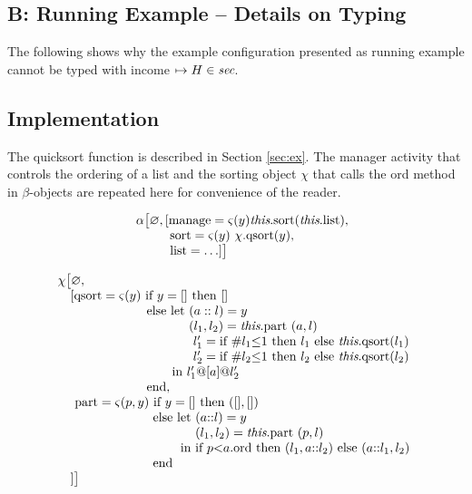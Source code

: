 \documentclass[10pt, conference, compsocconf]{IEEEtran}
\newcommand{\symb}[1]{\makebox{\it #1}}
\begin{document}
{\subsection*{B: Running Example -- Details on Typing}
The following shows why the example configuration presented as running example cannot be typed
with income $\mapsto H \in \symb{sec}$. 

\subsection*{Implementation}
The quicksort function  is described in Section \ref{sec:ex}.
The manager activity that controls the ordering of a list and the sorting object $\chi$ that
calls the ord method in $\beta$-objects are repeated here for convenience of the reader.

\noindent \begin{small}
\[
 \begin{array}{ll}
   & \alpha \big[\varnothing, [ \text{manage} = \varsigma(y) \text{{\it this}.sort({\it this}.list)}, \\
  & \  \qquad\ \text{sort} = \varsigma(y)\ \chi.\text{qsort}(y),\\
  & \  \qquad\ \text{list} = \ldots ] \big]
 \end{array}
\]
\end{small}

\noindent \begin{small}
\[
 \begin{array}{l}
   \chi \big[\varnothing, \\
   \quad [ \text{qsort} = \varsigma(y)\ \text{if}\ y = []\ \text{then}\ [] \\
   \ \qquad \qquad \qquad \ \ \text{else let}\ (a::l) = y \\
   \ \qquad \qquad \qquad \qquad \qquad (l_1,l_2) = \text{{\it this}.part}\ (a, l) \\
   \ \qquad \qquad \qquad \qquad \qquad\ l_1' = \text{if}\ \#l_1 \mathord{\leq} 1\ \text{then}\ l_1\ \text{else {\it this}.qsort}(l_1) \\
   \ \qquad \qquad \qquad \qquad \qquad\ l_2' = \text{if}\ \#l_2 \mathord{\leq} 1\ \text{then}\ l_2\ \text{else {\it this}.qsort}(l_2) \\
   \ \qquad \qquad \qquad \qquad \ \ \text{in}\ l_1' @ [a] @ l_2'\ \\
   \ \qquad \qquad \qquad \ \ \text{end},\\
   \ \quad \text{part} = \varsigma(p,y)\ \text{if}\ y = []\ \text{then}\ ([],[])\\
   \ \qquad \qquad \qquad \quad\, \text{else let}\ (a\mathord{::}l) = y \\
   \ \qquad \qquad \qquad \qquad \qquad \ \, (l_1,l_2) = \text{{\it this}.part}\ (p,l) \\
   \ \qquad \qquad \qquad \qquad \quad \ \text{in if}\ p \mathord{<} a.\text{ord then}\ (l_1, a\mathord{::}l_2)\ 
                                             \text{else}\ (a\mathord{::}l_1,l_2)\ \\
   \  \qquad \qquad \qquad \quad\, \text{end}\\
   \quad ]\big]
  \end{array}
\]
\end{small}


}
\end{document}
